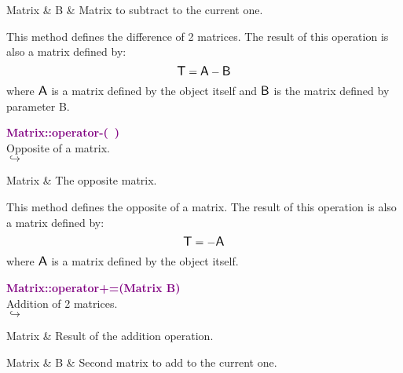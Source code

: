 \begin{tcolorbox}[width=\textwidth,myArgs,tabularx={ll|R}]
Matrix & B & Matrix to subtract to the current one.
\end{tcolorbox}

This method defines the difference of 2 matrices.
The result of this operation is also a matrix defined by:
\begin{equation*}
\mbox{\large\ensuremath{\mathsf{T}}} = \mbox{\large\ensuremath{\mathsf{A}}} - \mbox{\large\ensuremath{\mathsf{B}}}
\end{equation*}
where $\mbox{\large\ensuremath{\mathsf{A}}}$ is a matrix defined by the object itself and $\mbox{\large\ensuremath{\mathsf{B}}}$ is the matrix defined by parameter B.

\textcolor{purple}{\textbf{Matrix::operator-(~)}}\label{Matrix::operator-()}\\
Opposite of a matrix.\\ \hspace*{5mm}$\hookrightarrow$
\vspace*{-2em}\begin{tcolorbox}[grow to left by=-1cm, width=\textwidth-1cm,myArgs,tabularx={l|R}]
Matrix & The opposite matrix.
\end{tcolorbox}

This method defines the opposite of a matrix.
The result of this operation is also a matrix defined by:
\begin{equation*}
\mbox{\large\ensuremath{\mathsf{T}}} = - \mbox{\large\ensuremath{\mathsf{A}}}
\end{equation*}
where $\mbox{\large\ensuremath{\mathsf{A}}}$ is a matrix defined by the object itself.

\textcolor{purple}{\textbf{Matrix::operator+=(Matrix B)}}\label{Matrix::operator+=(Matrix B)}\\
Addition of 2 matrices.\\ \hspace*{5mm}$\hookrightarrow$
\vspace*{-2em}\begin{tcolorbox}[grow to left by=-1cm, width=\textwidth-1cm,myArgs,tabularx={l|R}]
Matrix & Result of the addition operation.
\end{tcolorbox}

\begin{tcolorbox}[width=\textwidth,myArgs,tabularx={ll|R}]
Matrix & B & Second matrix to add to the current one.
\end{tcolorbox}

